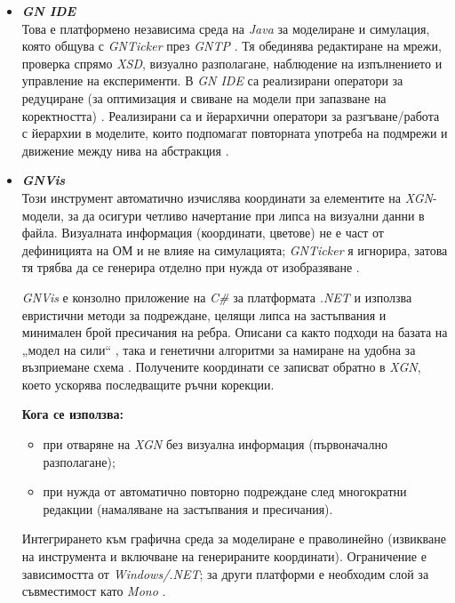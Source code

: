 \begin{itemize}
\begin{itemize}[itemsep=0.5em]
		
	\item \textbf{\textit{GN IDE}}\\
	Това е платформено независима среда на \textit{Java} \cite{JLS25} за моделиране и симулация, която общува с \textit{GNTicker} през \textit{GNTP} \cite{GNIDE2009}. Тя обединява редактиране на мрежи, проверка спрямо \textit{XSD}, визуално разполагане, наблюдение на изпълнението и управление на експерименти.
	В \textit{GN IDE} са реализирани оператори за редуциране (за оптимизация и свиване на модели при запазване на коректността) \cite{ReducingOps2015_2016}. Реализирани са и йерархични оператори за разгъване/работа с йерархии в моделите, които подпомагат повторната употреба на подмрежи и движение между нива на абстракция \cite{HierOps2022}.
	
	\item \textbf{\textit{GNVis}}\\	
	Този инструмент автоматично изчислява координати за елементите на \textit{XGN}-модели, за да осигури четливо начертание при липса на визуални данни в файла. Визуалната информация (координати, цветове) не е част от дефиницията на ОМ и не влияе на симулацията; \textit{GNTicker} я игнорира, затова тя трябва да се генерира отделно при нужда от изобразяване \cite{Trifonov2008}.
	
	\textit{GNVis} е конзолно приложение на \textit{C\#} за платформата \textit{.NET} и използва евристични методи за подреждане, целящи липса на застъпвания и минимален брой пресичания на ребра. Описани са както подходи на базата на „модел на сили“ \cite{Kamada1989}, така и генетични алгоритми за намиране на удобна за възприемане схема \cite{Trifonov2008}. Получените координати се записват обратно в \textit{XGN}, което ускорява последващите ръчни корекции.
	
	\textbf{Кога се използва:}
	\begin{itemize}[itemsep=0.25em]
		\item при отваряне на \textit{XGN} без визуална информация (първоначално разполагане);
		\item при нужда от автоматично повторно подреждане след многократни редакции (намаляване на застъпвания и пресичания).
	\end{itemize}
	
	Интегрирането към графична среда за моделиране е праволинейно (извикване на инструмента и включване на генерираните координати). Ограничение е зависимостта от \textit{Windows/.NET}; за други платформи е необходим слой за съвместимост като \textit{Mono} \cite{Mono}.
	

\end{itemize}
\end{itemize}
